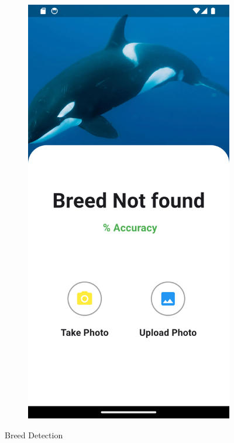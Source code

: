 \begin{figure}[H]
\begin{subfigure}{0.47\textwidth}
  \end{subfigure}%
  \hfill
  \begin{subfigure}{0.47\textwidth}
    \includegraphics[width=\linewidth]{img/dog6.png}
  \end{subfigure}
  \caption{Breed Detection}
  \label{fig:UI}
\end{figure}

